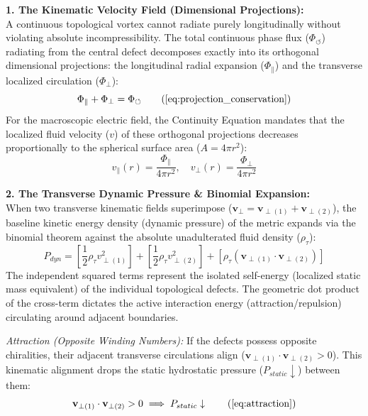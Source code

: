 \documentclass[11pt, a4paper]{article}
\begin{document}
\textbf{1. The Kinematic Velocity Field (Dimensional Projections):} \\
A continuous topological vortex cannot radiate purely longitudinally without violating absolute incompressibility. The total continuous phase flux ($\Phi_{\circlearrowleft}$) radiating from the central defect decomposes exactly into its orthogonal dimensional projections: the longitudinal radial expansion ($\Phi_{\parallel}$) and the transverse localized circulation ($\Phi_{\perp}$):
\begin{equation}
    \Phi_{\parallel} + \Phi_{\perp} = \Phi_{\circlearrowleft} \tag{\ref{eq:projection_conservation}}
\end{equation}
For the macroscopic electric field, the Continuity Equation mandates that the localized fluid velocity ($v$) of these orthogonal projections decreases proportionally to the spherical surface area ($A = 4\pi r^2$):
\begin{equation}
    v_{\parallel}(r) = \frac{\Phi_{\parallel}}{4\pi r^2}, \quad v_{\perp}(r) = \frac{\Phi_{\perp}}{4\pi r^2}
\end{equation}

\textbf{2. The Transverse Dynamic Pressure \& Binomial Expansion:} \\
When two transverse kinematic fields superimpose ($\mathbf{v}_{\perp} = \mathbf{v}_{\perp(1)} + \mathbf{v}_{\perp(2)}$), the baseline kinetic energy density (dynamic pressure) of the metric expands via the binomial theorem against the absolute unadulterated fluid density ($\rho_{\tau}$):
\begin{equation}
    P_{dyn} = \left[ \frac{1}{2}\rho_{\tau} v_{\perp(1)}^2 \right] + \left[ \frac{1}{2}\rho_{\tau} v_{\perp(2)}^2 \right] + \left[ \rho_{\tau} (\mathbf{v}_{\perp(1)} \cdot \mathbf{v}_{\perp(2)}) \right] \label{eq:binomial_energy}
\end{equation}
The independent squared terms represent the isolated self-energy (localized static mass equivalent) of the individual topological defects. The geometric dot product of the cross-term dictates the active interaction energy (attraction/repulsion) circulating around adjacent boundaries.

\textit{Attraction (Opposite Winding Numbers):} If the defects possess opposite chiralities, their adjacent transverse circulations align ($\mathbf{v}_{\perp(1)} \cdot \mathbf{v}_{\perp(2)} > 0$). This kinematic alignment drops the static hydrostatic pressure ($P_{static} \downarrow$) between them:
\begin{equation}
    \mathbf{v}_{\perp(1)} \cdot \mathbf{v}_{\perp(2)} > 0 \implies P_{static} \downarrow \tag{\ref{eq:attraction}}
\end{equation}
\end{document}
